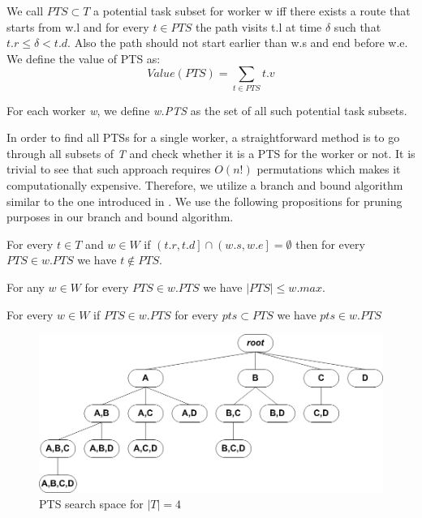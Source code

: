 \begin{definition} 
\label{def:PTS}
We call $PTS \subset T$ a potential task subset for worker w iff there exists a route that starts from w.l and for every $t \in PTS$ the path visits t.l at time $\delta$ such that $t.r \leq \delta < t.d$. Also the path should not start earlier than w.s and end before w.e. We define the value of PTS as:
\begin{equation*}
Value(PTS) = \sum_{t \in PTS} t.v
\end{equation*}
\end{definition}

For each worker \emph{w}, we define \emph{w.PTS} as the set of all such potential task subsets.

In order to find all PTSs for a single worker, a straightforward method is to go through all subsets of \emph{T} and check whether it is a PTS for the worker or not. It is trivial to see that such approach requires $O(n!)$ permutations which makes it computationally expensive. Therefore, we utilize a branch and bound algorithm similar to the one introduced in \cite{Deng13}. We use the following propositions for pruning purposes in our branch and bound algorithm.

\begin{proposition}
\label{prop:overlap}
For every $t \in T$ and $w \in W$ if $\left(t.r, t.d \right] \cap \left( w.s, w.e \right] = \emptyset$ then for every $PTS \in w.PTS$ we have $t \not\in PTS$.
\end{proposition}

\begin{proposition}
\label{prop:size}
For any $w \in W$ for every $PTS \in w.PTS$ we have $\left\vert{PTS}\right\vert \leq w.max$.
\end{proposition}

\begin{proposition}
\label{prop:subset}
For every $w \in W$ if $PTS \in w.PTS$ for every $pts \subset PTS$ we have $pts \in w.PTS$
\end{proposition}

\begin{figure}[t]
	\centering
	\includegraphics[width = 0.85\columnwidth]{figures/PTS_tree.png}
			\vspace{-0.2cm}
	\caption{PTS search space for $\left\vert T \right\vert = 4$}
	\label{fig:PTS_tree}
			\vspace{-0.2cm}
\end{figure}

